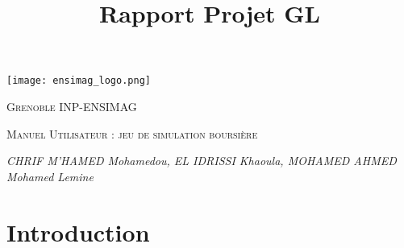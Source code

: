 \documentclass[10pt]{article}
\title{Rapport Projet GL}
\date{}
\author{}
\begin{document}
\large
\begin{titlepage}
    \centering
    \begin{minipage}{0.5\textwidth}

        \centering
        \texttt{[image: ensimag\_logo.png]}

    \end{minipage}%

    
    {\scshape\LARGE Grenoble INP-ENSIMAG  \par}
    \vspace{4cm}
    {\scshape\Large  Manuel Utilisateur :  jeu de simulation boursière \par}
    \vspace{8cm}
    {\Large\itshape CHRIF M'HAMED Mohamedou, EL IDRISSI Khaoula, MOHAMED AHMED Mohamed Lemine
\par}


\end{titlepage}

\tableofcontents

\newpage
\section{\textbf{Introduction}}
\end{document}
